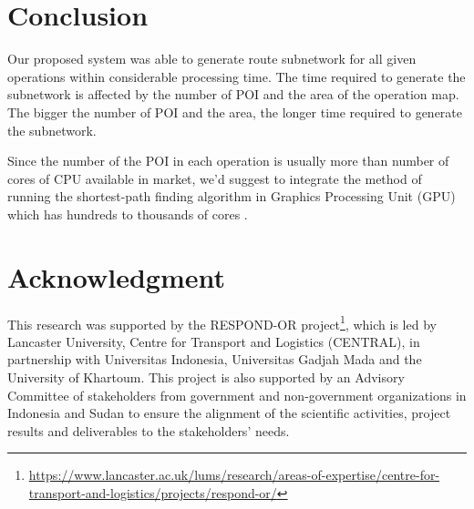 \documentclass[conference]{IEEEtran}
\begin{document}
\section{Conclusion}

Our proposed system was able to generate route subnetwork for all given operations within considerable processing time. The time required to generate the subnetwork is affected by the number of POI and the area of the operation map. The bigger the number of POI and the area, the longer time required to generate the subnetwork.

Since the number of the POI in each operation is usually more than number of cores of CPU available in market, we'd suggest to integrate the method of running the shortest-path finding algorithm in Graphics Processing Unit (GPU) which has hundreds to thousands of cores \cite{harish2007accelerating}.

\section*{Acknowledgment}

This research was supported by the RESPOND-OR project\footnote{\url{https://www.lancaster.ac.uk/lums/research/areas-of-expertise/centre-for-transport-and-logistics/projects/respond-or/}}, which is led by Lancaster University, Centre for Transport and Logistics (CENTRAL), in partnership with Universitas Indonesia, Universitas Gadjah Mada and the University of Khartoum. This project is also supported by an Advisory Committee of stakeholders from government and non-government organizations in Indonesia and Sudan to ensure the alignment of the scientific activities, project results and deliverables to the stakeholders’ needs.



\end{document}

